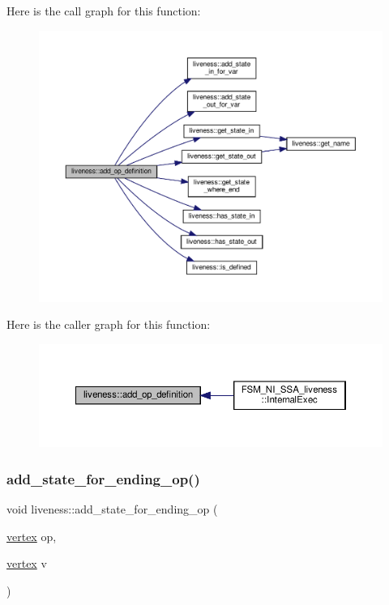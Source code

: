 Here is the call graph for this function\+:
\nopagebreak
\begin{figure}[H]
\begin{center}
\leavevmode
\includegraphics[width=350pt]{d3/d1f/classliveness_a4f1473f6c023b994a455fceaea3c9015_cgraph}
\end{center}
\end{figure}
Here is the caller graph for this function\+:
\nopagebreak
\begin{figure}[H]
\begin{center}
\leavevmode
\includegraphics[width=350pt]{d3/d1f/classliveness_a4f1473f6c023b994a455fceaea3c9015_icgraph}
\end{center}
\end{figure}
\mbox{\label{classliveness_a288fca9d3983f844e29898fcf401890a}} 
\subsubsection{\texorpdfstring{add\+\_\+state\+\_\+for\+\_\+ending\+\_\+op()}{add\_state\_for\_ending\_op()}}
{\footnotesize\ttfamily void liveness\+::add\+\_\+state\+\_\+for\+\_\+ending\+\_\+op (\begin{DoxyParamCaption}\item[{\hyperlink{graph_8hpp_abefdcf0544e601805af44eca032cca14}{vertex}}]{op,  }\item[{\hyperlink{graph_8hpp_abefdcf0544e601805af44eca032cca14}{vertex}}]{v }\end{DoxyParamCaption})\hspace{0.3cm}{\ttfamily [inline]}}



